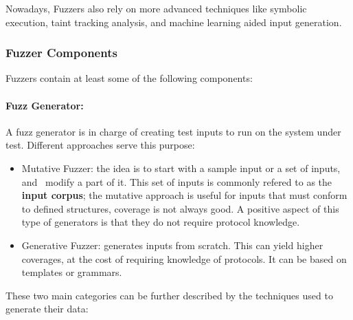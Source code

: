 

Nowadays, Fuzzers also rely on more advanced techniques like symbolic execution,
taint tracking analysis, and machine learning aided input generation.

\subsubsection{Fuzzer Components}

Fuzzers contain at least some of the following components:

\paragraph{Fuzz Generator:}

A fuzz generator is in charge of creating test inputs to run on the system under test. Different
approaches serve this purpose\cite{mcnallyFuzzingStateArt2012}:

\begin{itemize}\label{ss:fuzzer-components}
    \item Mutative Fuzzer: the idea is to start with a sample input or a set of inputs, and \
    modify a part of it. This set of inputs is commonly refered to as the \textbf{input corpus}; the mutative approach is useful for inputs that must conform to defined structures, coverage is not
    always good. A positive aspect of this type of generators is that they do not require protocol knowledge.
    \item Generative Fuzzer: generates inputs from scratch. This can yield higher coverages, at the cost of requiring
    knowledge of protocols. It can be based on templates or grammars.
\end{itemize}

These two main categories can be further described by the techniques used to generate their data:

